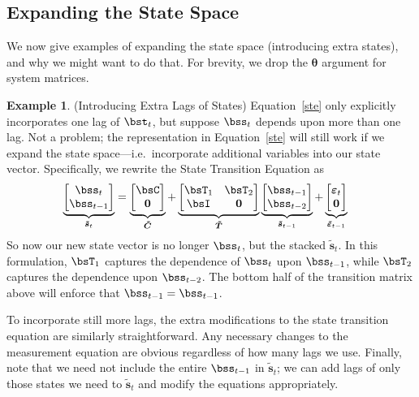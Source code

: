 \documentclass[12pt]{article}
\theoremstyle{plain}
\theoremstyle{definition}
\newtheorem{ex}[thm]{Example}
\theoremstyle{remark}
\newcommand{\bstheta}{\boldsymbol{\theta}}
\newcommand{\bsvarepsilon}{\boldsymbol{\varepsilon}}
\newcommand{\bstildevarepsilon}{\boldsymbol{\tilde{\varepsilon}}}
\newcommand{\bstildes}{\boldsymbol{\tilde{s}}}
\newcommand{\bstildeT}{\boldsymbol{\tilde{T}}}
\newcommand{\bstildeC}{\boldsymbol{\tilde{C}}}
\renewcommand{\bso}{\boldsymbol{0}}
\begin{document}
\clearpage
\subsection{Expanding the State Space}

We now give examples of expanding the state space (introducing extra
states), and why we might want to do that. For brevity, we drop the
$\bstheta$ argument for system matrices.

\begin{ex}(Introducing Extra Lags of States)
Equation~\ref{ste} only explicitly incorporates one lag of $\bst_t$, but
suppose $\bss_t$ depends upon more than one lag. Not a problem; the
representation in Equation~\ref{ste} will still work if we expand the
state space---i.e.\ incorporate additional variables into our state
vector. Specifically, we rewrite the State Transition Equation as
\begin{align}
  \underbrace{%
    \begin{bmatrix} \bss_{t} \\ \bss_{t-1}
    \end{bmatrix}
  }_{\bstildes_t}
     &=
  \underbrace{%
    \begin{bmatrix} \bsC \\ \bso
    \end{bmatrix}
  }_{\bstildeC}
  +
  \underbrace{%
    \begin{bmatrix} \bsT_1 & \bsT_2 \\ \bsI & \bso
    \end{bmatrix}
  }_{\bstildeT}
  \underbrace{%
    \begin{bmatrix} \bss_{t-1} \\ \bss_{t-2}
    \end{bmatrix}
  }_{\bstildes_{t-1}}
  +
  \underbrace{%
    \begin{bmatrix}
      \bsvarepsilon_{t}  \\ \bso
    \end{bmatrix}
  }_{\bstildevarepsilon_{t-1}}
  \label{augmented.lags}
\end{align}
So now our new state vector is no longer $\bss_t$, but the stacked
$\bstildes_t$. In this formulation, $\bsT_1$ captures the dependence of
$\bss_t$ upon $\bss_{t-1}$, while $\bsT_2$ captures the dependence upon
$\bss_{t-2}$. The bottom half of the transition matrix above will
enforce that $\bss_{t-1}=\bss_{t-1}$.

To incorporate still more lags, the extra modifications to the state
transition equation are similarly straightforward. Any necessary changes
to the measurement equation are obvious regardless of how many lags we
use. Finally, note that we need not include the entire $\bss_{t-1}$ in
$\bstildes_t$; we can add lags of only those states we need to
$\bstildes_t$ and modify the equations appropriately.
\end{ex}
\end{document}
